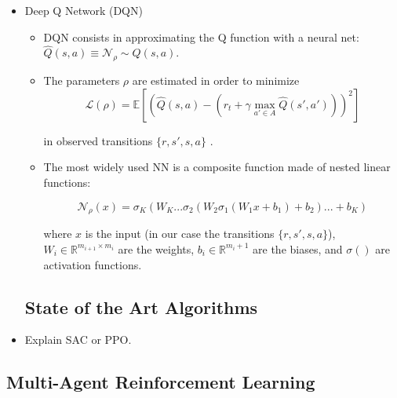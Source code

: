 \documentclass[11pt,english]{article}
\newcommand{\E}{\mathbb{E}}
\begin{document}
\begin{itemize}
	\item Deep Q Network (DQN)
	\begin{itemize}
		\item DQN consists in approximating the Q function with a neural net: $\hat{Q}(s,a) \equiv  \mathcal{N}_\rho \sim Q(s,a)$.\medskip
		\item The parameters $\rho$ are estimated in order to minimize\medskip
		$$\mathcal{L}(\rho)=\E \left[ \left(\hat{Q}(s,a)-(r_t+\gamma \max_{a' \in A} \hat{Q}(s',a')) \right)^2 \right] $$
		
		in observed transitions $\{r, s'  ,s, a\}$ .\medskip
		
		\item The most widely used NN is a composite function made of nested linear functions:  \medskip
		
		$$\mathcal{N}_\rho (x)=\sigma_K(W_K ... \sigma_2(W_2 \sigma_1(W_1x+b_1)+b_2)...+b_K)$$
		
		where $x$ is the input (in our case the transitions $\{r, s'  ,s, a\}$), $W_i \in \mathbb{R}^{m_{i+1}\times m_i}$ are the weights, $b_i \in \mathbb{R}^{m_i+1}$ are the biases, and $\sigma()$ are activation functions.
	\end{itemize}

\subsection{State of the Art Algorithms}

	\item Explain SAC or PPO.
\end{itemize}

\subsection{Multi-Agent Reinforcement Learning}
\end{document}
